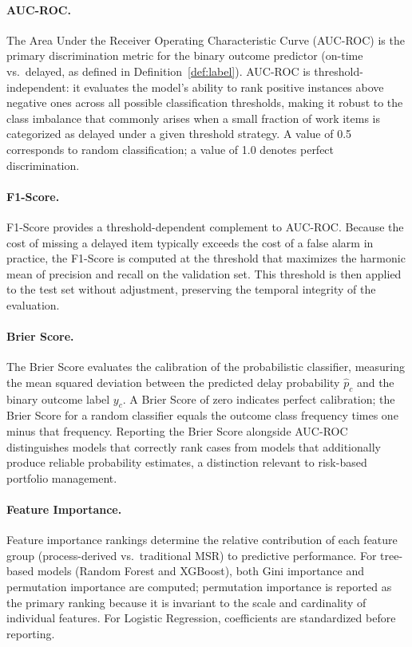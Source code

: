 \paragraph{AUC-ROC.}
The Area Under the Receiver Operating Characteristic Curve (AUC-ROC)
is the primary discrimination metric for the binary outcome predictor
(on-time vs.\ delayed, as defined in
Definition~\ref{def:label}).
AUC-ROC is threshold-independent: it evaluates the model's ability
to rank positive instances above negative ones across all possible
classification thresholds, making it robust to the class imbalance
that commonly arises when a small fraction of work items is
categorized as delayed under a given threshold strategy.
A value of 0.5 corresponds to random classification; a value of 1.0
denotes perfect discrimination.
 
\paragraph{F1-Score.}
F1-Score provides a threshold-dependent complement to AUC-ROC.
Because the cost of missing a delayed item typically exceeds the
cost of a false alarm in practice, the F1-Score is computed at the
threshold that maximizes the harmonic mean of precision and recall
on the validation set.
This threshold is then applied to the test set without adjustment,
preserving the temporal integrity of the evaluation.
 
\paragraph{Brier Score.}
The Brier Score evaluates the calibration of the probabilistic
classifier, measuring the mean squared deviation between the
predicted delay probability $\hat{p}_c$ and the binary outcome
label $y_c$.
A Brier Score of zero indicates perfect calibration; the Brier Score
for a random classifier equals the outcome class frequency times one
minus that frequency.
Reporting the Brier Score alongside AUC-ROC distinguishes models
that correctly rank cases from models that additionally produce
reliable probability estimates, a distinction relevant to risk-based
portfolio management.
 
\paragraph{Feature Importance.}
Feature importance rankings determine the relative contribution of
each feature group (process-derived vs.\ traditional MSR) to
predictive performance.
For tree-based models (Random Forest and XGBoost), both Gini
importance and permutation importance are computed; permutation
importance is reported as the primary ranking because it is
invariant to the scale and cardinality of individual features.
For Logistic Regression, coefficients are standardized before
reporting.
 
